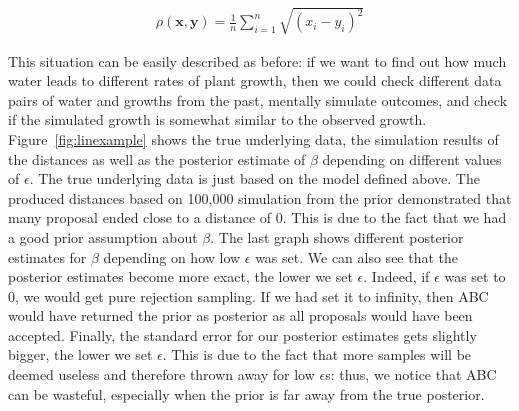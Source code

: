 \documentclass[a4paper,man, natbib]{apa6}
\begin{document}
\begin{align}
\label{eq:eucliddist}
\rho(\mathbf{x},\mathbf{y})=\frac{1}{n}\sum_{i=1}^{n}\sqrt{(x_i-y_i)^2}
\end{align}

This situation can be easily described as before: if we want to find out how much water leads to different rates of plant growth, then we could check different data pairs of water and growths from the past, mentally simulate outcomes, and check if the simulated growth is somewhat similar to the observed growth.
Figure~\ref{fig:linexample} shows the true underlying data, the simulation results of the distances as well as the posterior estimate of $\beta$ depending on different values of $\epsilon$. The true underlying data is just based on the model defined above. The produced distances based on 100,000 simulation from the prior demonstrated that many proposal ended close to a distance of 0. This is due to the fact that we had a good prior assumption about $\beta$. The last graph shows different posterior estimates for $\beta$ depending on how low $\epsilon$ was set. We can also see that the posterior estimates become more exact, the lower we set $\epsilon$. Indeed, if $\epsilon$ was set to 0, we would get pure rejection sampling. If we had set it to infinity, then ABC would have returned the prior as posterior as all proposals would have been accepted. Finally, the standard error for our posterior estimates gets slightly bigger, the lower we set $\epsilon$. This is due to the fact that more samples will be deemed useless and therefore thrown away for low $\epsilon$s:  thus, we notice that ABC can be wasteful, especially when the prior is far away from the true posterior. 
\end{document}
